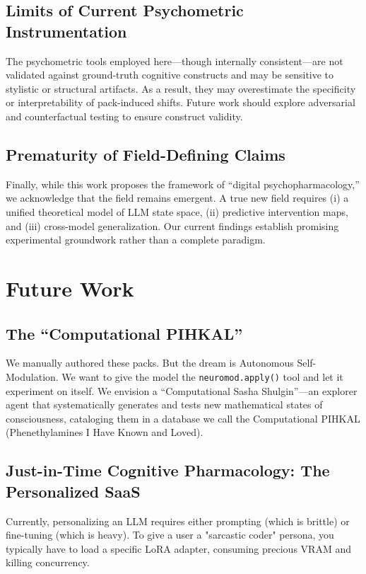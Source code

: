 \documentclass[10pt, twocolumn]{article}
\begin{document}
\subsection{Limits of Current Psychometric Instrumentation}
The psychometric tools employed here---though internally consistent---are not validated against ground-truth cognitive constructs and may be sensitive to stylistic or structural artifacts. As a result, they may overestimate the specificity or interpretability of pack-induced shifts. Future work should explore adversarial and counterfactual testing to ensure construct validity.

\subsection{Prematurity of Field-Defining Claims}
Finally, while this work proposes the framework of ``digital psychopharmacology,'' we acknowledge that the field remains emergent. A true new field requires (i) a unified theoretical model of LLM state space, (ii) predictive intervention maps, and (iii) cross-model generalization. Our current findings establish promising experimental groundwork rather than a complete paradigm.


\section{Future Work}

\subsection{The ``Computational PIHKAL''}
We manually authored these packs. But the dream is Autonomous Self-Modulation. We want to give the model the \texttt{neuromod.apply()} tool and let it experiment on itself. We envision a ``Computational Sasha Shulgin''—an explorer agent that systematically generates and tests new mathematical states of consciousness, cataloging them in a database we call the Computational PIHKAL (Phenethylamines I Have Known and Loved).

\subsection{Just-in-Time Cognitive Pharmacology: The Personalized SaaS}
Currently, personalizing an LLM requires either prompting (which is brittle) or fine-tuning (which is heavy). To give a user a "sarcastic coder" persona, you typically have to load a specific LoRA adapter, consuming precious VRAM and killing concurrency.
\end{document}
